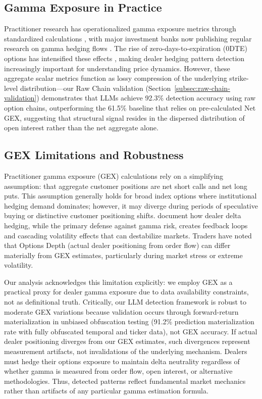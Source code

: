 \subsection{Gamma Exposure in Practice}
Practitioner research has operationalized gamma exposure metrics through standardized calculations \citep{spotgamma2019,spotgamma2021, squeezemetrics2017,squeezemetrics2020}, with major investment banks now publishing regular research on gamma hedging flows \citep{nomura2017}. The rise of zero-days-to-expiration (0DTE) options has intensified these effects \citep{cboe2023,jpmorgan2023}, making dealer hedging pattern detection increasingly important for understanding price dynamics. However, these aggregate scalar metrics function as lossy compression of the underlying strike-level distribution---our Raw Chain validation (Section~\ref{subsec:raw-chain-validation}) demonstrates that LLMs achieve 92.3\% detection accuracy using raw option chains, outperforming the 61.5\% baseline that relies on pre-calculated Net GEX, suggesting that structural signal resides in the dispersed distribution of open interest rather than the net aggregate alone.

\subsection{GEX Limitations and Robustness}

Practitioner gamma exposure (GEX) calculations rely on a simplifying assumption: that aggregate customer positions are net short calls and net long puts. This assumption generally holds for broad index options where institutional hedging demand dominates; however, it may diverge during periods of speculative buying or distinctive customer positioning shifts. \citet{krishnan2021market} document how dealer delta hedging, while the primary defense against gamma risk, creates feedback loops and cascading volatility effects that can destabilize markets. Traders have noted that Options Depth (actual dealer positioning from order flow) can differ materially from GEX estimates, particularly during market stress or extreme volatility.

Our analysis acknowledges this limitation explicitly: we employ GEX as a practical proxy for dealer gamma exposure due to data availability constraints, not as definitional truth. Critically, our LLM detection framework is robust to moderate GEX variations because validation occurs through forward-return materialization in unbiased obfuscation testing (91.2\% prediction materialization rate with fully obfuscated temporal and ticker data), not GEX accuracy. If actual dealer positioning diverges from our GEX estimates, such divergences represent measurement artifacts, not invalidations of the underlying mechanism. Dealers must hedge their options exposure to maintain delta neutrality regardless of whether gamma is measured from order flow, open interest, or alternative methodologies. Thus, detected patterns reflect fundamental market mechanics rather than artifacts of any particular gamma estimation formula.

